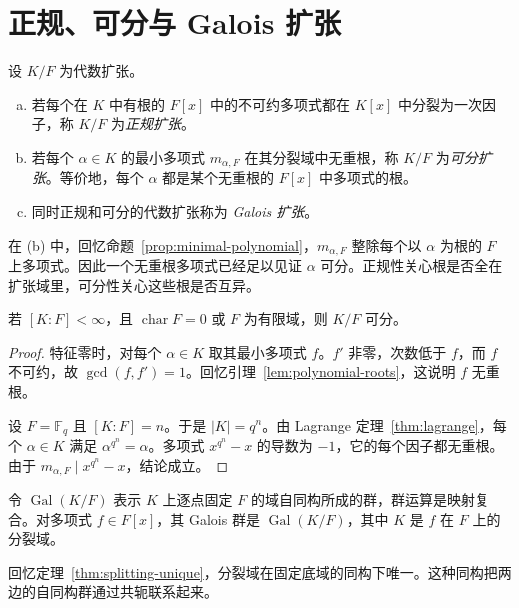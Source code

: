 \documentclass[lang=cn,a4paper,fontset=none,zihao=false,10pt,openany,twoside]{beautybook}
\numberwithin{algorithm}{chapter}
\begin{document}
\section{正规、可分与 Galois 扩张}\label{sec:galois-extensions}

\begin{definition}\label{def:galois-extension}
设 $K/F$ 为代数扩张。
\begin{enumerate}[(a)]
\item 若每个在 $K$ 中有根的 $F[x]$ 中的不可约多项式都在 $K[x]$ 中分裂为一次因子，称 $K/F$ 为\emph{正规扩张}。
\item 若每个 $\alpha\in K$ 的最小多项式 $m_{\alpha,F}$ 在其分裂域中无重根，称 $K/F$ 为\emph{可分扩张}。等价地，每个 $\alpha$ 都是某个无重根的 $F[x]$ 中多项式的根。
\item 同时正规和可分的代数扩张称为 \emph{Galois 扩张}。
\end{enumerate}
\end{definition}
在 (b) 中，回忆命题~\ref{prop:minimal-polynomial}，$m_{\alpha,F}$ 整除每个以 $\alpha$ 为根的 $F$ 上多项式。因此一个无重根多项式已经足以见证 $\alpha$ 可分。正规性关心根是否全在扩张域里，可分性关心这些根是否互异。

\begin{proposition}[特征零和有限域上的可分性]
若 $[K:F]<\infty$，且 $\operatorname{char}F=0$ 或 $F$ 为有限域，则 $K/F$ 可分。
\end{proposition}
\begin{proof}
特征零时，对每个 $\alpha\in K$ 取其最小多项式 $f$。$f'$ 非零，次数低于 $f$，而 $f$ 不可约，故 $\gcd(f,f')=1$。回忆引理~\ref{lem:polynomial-roots}，这说明 $f$ 无重根。

设 $F=\mathbb F_q$ 且 $[K:F]=n$。于是 $|K|=q^n$。由 Lagrange 定理~\ref{thm:lagrange}，每个 $\alpha\in K$ 满足 $\alpha^{q^n}=\alpha$。多项式 $x^{q^n}-x$ 的导数为 $-1$，它的每个因子都无重根。由于 $m_{\alpha,F}\mid x^{q^n}-x$，结论成立。
\end{proof}

\begin{definition}[Galois 群]\label{def:galois-group}
令 $\operatorname{Gal}(K/F)$ 表示 $K$ 上逐点固定 $F$ 的域自同构所成的群，群运算是映射复合。对多项式 $f\in F[x]$，其 Galois 群是 $\operatorname{Gal}(K/F)$，其中 $K$ 是 $f$ 在 $F$ 上的分裂域。
\end{definition}
回忆定理~\ref{thm:splitting-unique}，分裂域在固定底域的同构下唯一。这种同构把两边的自同构群通过共轭联系起来。
\end{document}
